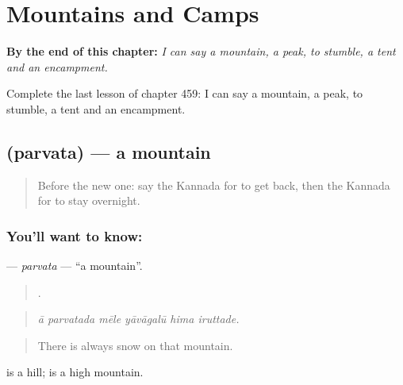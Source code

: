 
\chapter{Mountains and Camps}
\label{ch:ka-mountains-and-camps}

\begin{chapteropening}
\textbf{By the end of this chapter:} \emph{I can say a mountain, a peak, to stumble, a tent and an encampment.}

Complete the last lesson of chapter 459: I can say a mountain, a peak, to stumble, a tent and an encampment.
\end{chapteropening}

\section[\texorpdfstring{\kn{ಪರ್ವತ} (parvata)}{ಪರ್ವತ (parvata)}]{ (parvata) — a mountain}

\label{lesson:KA-C459-parvata}



\begin{quote}
Before the new one: say the Kannada for to get back, then the Kannada for to stay overnight.
\end{quote}

\subsection*{You'll want to know: }
\textbf{} — \emph{parvata} — \textquotedblleft{}a mountain\textquotedblright{}.

\begin{quote}
     .
\end{quote}

\begin{quote}
\emph{ā parvatada mēle yāvāgalū hima iruttade.}
\end{quote}

\begin{quote}
There is always snow on that mountain.
\end{quote}

 is a hill;  is a high mountain.

